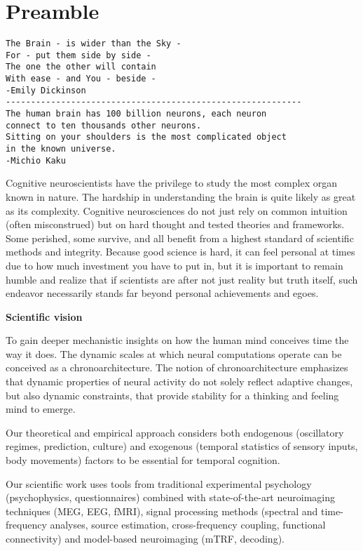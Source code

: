 \documentclass[]{book}
\begin{document}
\hypertarget{preamble}{%
\chapter{Preamble}\label{preamble}}

\begin{verbatim}
The Brain - is wider than the Sky -
For - put them side by side -
The one the other will contain
With ease - and You - beside -
-Emily Dickinson 
-----------------------------------------------------------  
The human brain has 100 billion neurons, each neuron 
connect to ten thousands other neurons. 
Sitting on your shoulders is the most complicated object 
in the known universe.
-Michio Kaku
\end{verbatim}

Cognitive neuroscientists have the privilege to study the most complex organ known in nature. The hardship in understanding the brain is quite likely as great as its complexity. Cognitive neurosciences do not just rely on common intuition (often misconstrued) but on hard thought and tested theories and frameworks. Some perished, some survive, and all benefit from a highest standard of scientific methods and integrity. Because good science is hard, it can feel personal at times due to how much investment you have to put in, but it is important to remain humble and realize that if scientists are after not just reality but truth itself, such endeavor necessarily stands far beyond personal achievements and egoes.

\textbf{Scientific vision}

To gain deeper mechanistic insights on how the human mind conceives time the way it does. The dynamic scales at which neural computations operate can be conceived as a chronoarchitecture. The notion of chronoarchitecture emphasizes that dynamic properties of neural activity do not solely reflect adaptive changes, but also dynamic constraints, that provide stability for a thinking and feeling mind to emerge.

Our theoretical and empirical approach considers both endogenous (oscillatory regimes, prediction, culture) and exogenous (temporal statistics of sensory inputs, body movements) factors to be essential for temporal cognition.

Our scientific work uses tools from traditional experimental psychology (psychophysics, questionnaires) combined with state-of-the-art neuroimaging techniques (MEG, EEG, fMRI), signal processing methods (spectral and time-frequency analyses, source estimation, cross-frequency coupling, functional connectivity) and model-based neuroimaging (mTRF, decoding).
\end{document}
